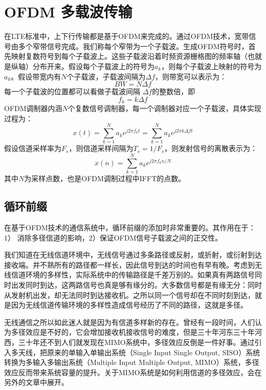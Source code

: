 \documentclass[10pt,a4paper,UTF8]{article}
\begin{document}
\section{OFDM 多载波传输}
\label{sec:orgheadline13}


在LTE标准中，上下行传输都是基于OFDM来完成的。通过OFDM技术，宽带信号由多个窄带信号完成。我们称每个窄带为一个子载波。生成OFDM符号时，首先映射复数符号到每个子载波上。这些子载波沿着时频资源栅格图的频率轴（也就是纵轴）分布开来。假设每个子载波上的符号为\(a_{k}\)，则每个子载波上映射的符号为\(a_{k}\)。假设带宽内有\(N\)个子载波，子载波间隔为\(\Delta f\)，则带宽可以表示为：
\begin{equation}
\label{eq:1}
BW = N\Delta f
\end{equation}
每一个子载波的位置都可以看做子载波间隔 \(\Delta f\)的整数倍，即
\begin{equation}
\label{eq:2}
f_{k} = k \Delta f
\end{equation}
OFDM调制器内涵\(N\)个复数信号调制器，每一个调制器对应一个子载波，具体实现过程为：
\begin{equation}
\label{eq:3}
x(t) = \sum_{k = 1}^{N} a_{k} e^{j2\pi f_{k} t} = \sum_{k = 1}^{N} a_{k} e^{j2\pi k\Delta f t}
\end{equation}
假设信道采样率为\(F_{s}\)，则信道采样间隔为\(T_{s} = 1/F_{s}\)，则发射信号的离散表示为：
\begin{equation}
\label{eq:4}
x(n) = \sum_{k = 1}^{N} a_{k} e^{j2\pi f_{k} n/N}
\end{equation}
其中\(N\)为采样点数，也是OFDM调制过程中IFFT的点数。
\subsection{循环前缀}
\label{sec:orgheadline8}


在基于OFDM技术的通信系统中，循环前缀的添加时非常重要的。其作用在于：1） 消除多径信道的影响，2）保证OFDM信号子载波之间的正交性。

我们知道在无线信道环境中，无线信号通过多条路径或反射，或折射，或衍射到达接收端。并不熟所有的路径都一样长，因此信号到达的时间也有早有晚。考虑到无线信道环境的多样性，实际系统中的传输路径是千差万别的。如果真有两路信号同时出发同时到达，这两路信号也真是够有缘分的。大多数信号都是有缘无分：同时从发射机出发，却无法同时到达接收机。之所以同一个信号却在不同时刻到达，就是因为无线信道传输环境的多样性造成信号经历了不同的路径，这就是多径。

无线通信之所以如此迷人就是因为有信道多样新的存在。曾经有一段时间，人们认为多径效应是不好的，它会增加接收机接收信号的难度，但是三十年河东三十年河西，三十年还不到人们就发现在MIMO系统中，多径效应反倒是一件好事。通过引入多天线，把原来的单输入单输出系统（Single Input Single Output, SISO）系统转换为多输入多输出系统（Multiple Input Multiple Output, MIMO）系统，多径效应反而带来系统容量的提升。关于MIMO系统是如何利用信道的多径效应，会在另外的文章中展开。
\end{document}

